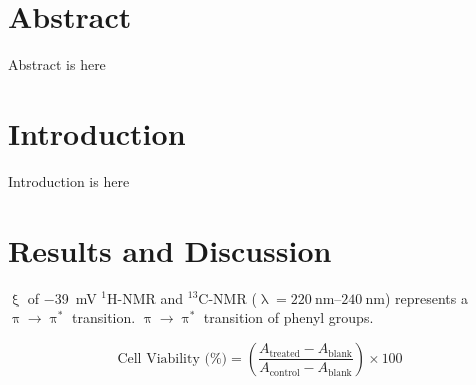 \newpage
\null
\thispagestyle{empty}
\newpage
\begin{refsection}%
	
	\vspace*{\fill}
	\begin{center}
	\end{center}
	\vspace*{\fill}
	
	
	\section{Abstract}
	Abstract is here
	
	\section{Introduction}
	Introduction is here
	\section{Results and Discussion}
	$\upxi$ of \SI{-39}{\milli\volt}  $^1$H-NMR and $^{13}$C-NMR ($\uplambda = \SIrange{220}{240}{\nano\metre}$) represents a $\uppi \rightarrow \uppi^*$ transition.
	$\uppi \rightarrow \uppi^*$ transition of phenyl groups.
	
	\begin{equation}
		\text{Cell Viability (\%)} =
		\left(
		\frac{A_{\text{treated}} - A_{\text{blank}}}
		{A_{\text{control}} - A_{\text{blank}}}
		\right)\times 100
	\end{equation}
	
	\clearpage
	\printbibliography
	\clearpage
\end{refsection}